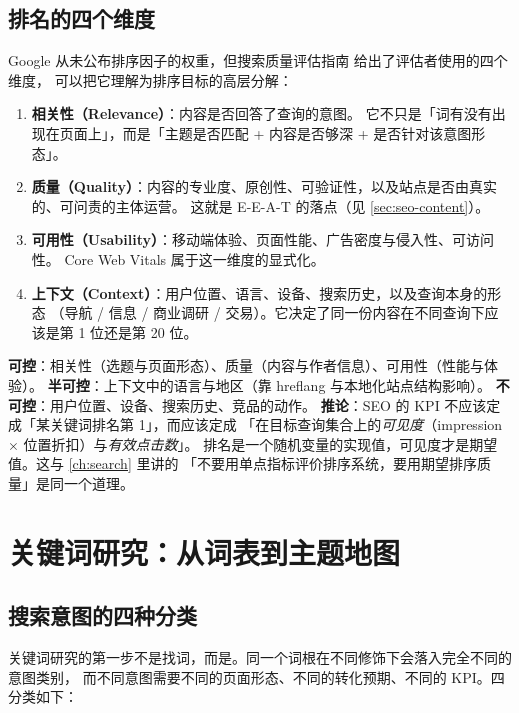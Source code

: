 \subsection{排名的四个维度}

Google 从未公布排序因子的权重，但搜索质量评估指南 \cite{google2024quality} 给出了评估者使用的四个维度，
可以把它理解为排序目标的高层分解：

\begin{enumerate}
  \item \textbf{相关性（Relevance）}：内容是否回答了查询的意图。
        它不只是「词有没有出现在页面上」，而是「主题是否匹配 + 内容是否够深 + 是否针对该意图形态」。
  \item \textbf{质量（Quality）}：内容的专业度、原创性、可验证性，以及站点是否由真实的、可问责的主体运营。
        这就是 E-E-A-T 的落点（见 \cref{sec:seo-content}）。
  \item \textbf{可用性（Usability）}：移动端体验、页面性能、广告密度与侵入性、可访问性。
        Core Web Vitals 属于这一维度的显式化。
  \item \textbf{上下文（Context）}：用户位置、语言、设备、搜索历史，以及查询本身的形态
        （导航 / 信息 / 商业调研 / 交易）。它决定了同一份内容在不同查询下应该是第 1 位还是第 20 位。
\end{enumerate}

\begin{keypoint}[把「排名」拆成可控项与不可控项]
\textbf{可控}：相关性（选题与页面形态）、质量（内容与作者信息）、可用性（性能与体验）。
\textbf{半可控}：上下文中的语言与地区（靠 hreflang 与本地化站点结构影响）。
\textbf{不可控}：用户位置、设备、搜索历史、竞品的动作。
\textbf{推论}：SEO 的 KPI 不应该定成「某关键词排名第 1」，而应该定成
「在目标查询集合上的\emph{可见度}（impression $\times$ 位置折扣）与\emph{有效点击数}」。
排名是一个随机变量的实现值，可见度才是期望值。这与 \cref{ch:search} 里讲的
「不要用单点指标评价排序系统，要用期望排序质量」是同一个道理。
\end{keypoint}

\section{关键词研究：从词表到主题地图}
\label{sec:seo-kw}

\subsection{搜索意图的四种分类}

关键词研究的第一步不是找词，而是。同一个词根在不同修饰下会落入完全不同的意图类别，
而不同意图需要不同的页面形态、不同的转化预期、不同的 KPI。四分类如下：

